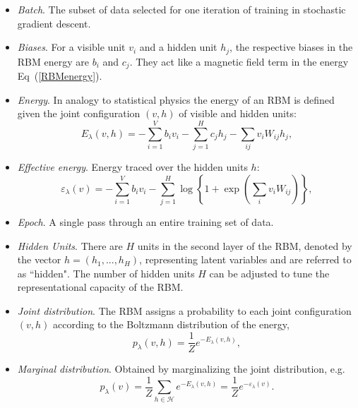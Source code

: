 \documentclass[submission, Phys]{SciPost}
\begin{document}
\begin{itemize}

\item {\it Batch}.  The subset of data selected for one iteration of training in stochastic gradient descent.

\item {\it Biases}.  For a visible unit $v_i$ and a hidden unit $h_j$, the respective biases in the RBM energy are $b_i$ and $c_j$. They act like a magnetic field term in the energy Eq~(\ref{RBMenergy}).

\item {\it Energy}.  In analogy to statistical physics the energy of an RBM is defined given the joint configuration $(v,h)$ of visible and hidden units:
\begin{equation}
E_{\lambda}(v,h) = - \sum\limits_{i=1}^V b_i v_i - \sum\limits_{j=1}^H c_j h_j - \sum\limits_{ij} v_i W_{ij} h_j, \label{RBMenergy} 
\end{equation}

\item {\it Effective energy}.  Energy traced over the hidden units $h$:
\begin{equation}
\varepsilon_{\lambda}(v) = - \sum\limits_{i=1}^V b_i v_i - \sum\limits_{j=1}^H \log \left\{ 1 + \exp \left( \sum\limits_{i} v_i W_{ij} \right) \right\}, \label{RBMeffectiveenergy} 
\end{equation}

\item {\it Epoch}.  A single pass through an entire training set of data.

\item {\it Hidden Units}.  There are $H$ units in the second layer of the RBM, denoted by the vector $h=(h_1, ..., h_H)$, representing latent variables and are referred to as ``hidden".  The number of hidden units $H$ can be adjusted to tune the representational capacity of the RBM.

\item {\it Joint distribution}.  The RBM assigns a probability to each joint configuration $(v,h)$ according to the Boltzmann distribution of the energy,
\begin{equation}
    p_{\lambda}(v,h) = \frac{1}{Z} e^{-E_{\lambda}(v,h)},
\end{equation}

\item {\it Marginal distribution}.  Obtained by marginalizing the joint distribution, e.g.
\begin{equation}
\label{Eq:marginal_distribution}
    p_{\lambda}(v) = \frac{1}{Z} \sum\limits_{h\in \mathcal{H}} e^{-E_{\lambda}(v,h)} = \frac{1}{Z} e^{- \varepsilon_{\lambda}(v)}.
\end{equation}


\end{itemize}
\end{document}
